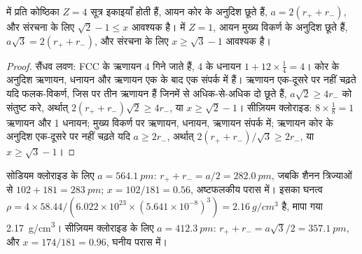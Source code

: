 \begin{proposition}[सैंधव-लवण और सीज़ियम क्लोराइड प्रकार]\label{prop:b1:crystals-ionic-covalent:nacl-cscl}
 में प्रति कोष्ठिका $Z = 4$ सूत्र इकाइयाँ होती हैं, आयन
कोर के अनुदिश छूते हैं, $a = 2(r_+ + r_-)$, और संरचना के लिए $\sqrt2 - 1
\le x$ आवश्यक है।  में $Z = 1$, आयन
मुख्य विकर्ण के अनुदिश छूते हैं, $a\sqrt3 = 2(r_+ + r_-)$, और संरचना के लिए
$x \ge \sqrt3 - 1$ आवश्यक है।
\end{proposition}

\begin{proof}
सैंधव लवण: FCC  के ऋणायन $4$ गिने जाते हैं, 4
 के धनायन $1 + 12 \times \frac14 = 4$। कोर के अनुदिश ऋणायन,
धनायन और ऋणायन एक के बाद एक संपर्क में हैं। ऋणायन एक-दूसरे पर नहीं चढ़ते
यदि फलक-विकर्ण, जिस पर तीन ऋणायन हैं जिनमें से अधिक-से-अधिक दो छूते हैं,
$a\sqrt2 \ge 4r_-$ को संतुष्ट करे, अर्थात् $2(r_+ + r_-)\sqrt2 \ge
4r_-$, या $x \ge \sqrt2 - 1$। सीज़ियम क्लोराइड: $8 \times \frac18 = 1$
ऋणायन और 1 धनायन; मुख्य विकर्ण पर ऋणायन, धनायन, ऋणायन
संपर्क में; ऋणायन कोर के अनुदिश एक-दूसरे पर नहीं चढ़ते यदि $a \ge 2r_-$, अर्थात्
$2(r_+ + r_-)/\sqrt3 \ge 2r_-$, या $x \ge \sqrt3 - 1$।
\end{proof}

\begin{example}[सोडियम क्लोराइड और सीज़ियम क्लोराइड]\label{ex:b1:crystals-ionic-covalent:nacl}
सोडियम क्लोराइड के लिए $a = \qty{564.1}{pm}$: $r_+ + r_- = a/2 =
\qty{282.0}{pm}$, जबकि शैनन त्रिज्याओं से $102 + 181 = \qty{283}{pm}$;
$x = 102/181 = 0.56$, अष्टफलकीय परास में। इसका घनत्व
$\rho = 4 \times 58.44/(6.022 \times 10^{23} \times (5.641 \times
10^{-8})^3) = \qty{2.16}{g/cm^3}$ है, मापा गया \qty{2.17}{g/cm^3}। सीज़ियम
क्लोराइड के लिए $a = \qty{412.3}{pm}$: $r_+ + r_- = a\sqrt3/2 =
\qty{357.1}{pm}$, और $x = 174/181 = 0.96$, घनीय परास में।
\end{example}

